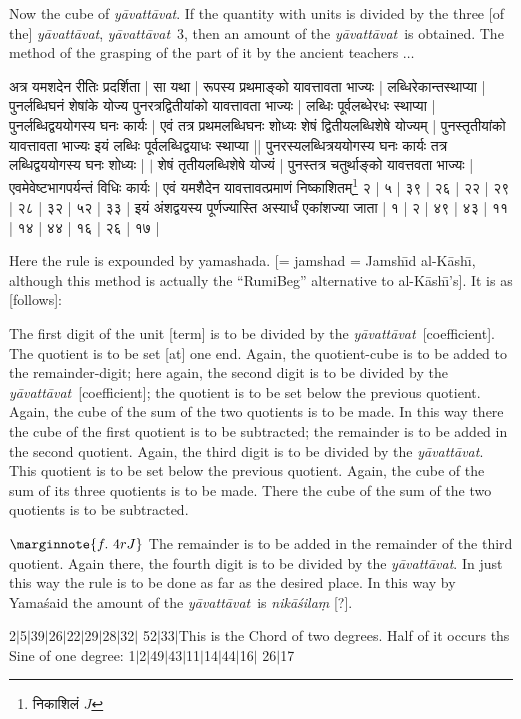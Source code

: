 \documentclass[12pt]{book}
\let\*=\d
\def\ya{\textit{y\=avat\-t\=avat}}
\def\elp{$\ldots$}
\def\danda{$|$}
\begin{document}
Now the cube of \ya.  If the quantity with units is divided by the three [of the] \ya,
\ya\ 3, 
then an amount of the \ya\ is obtained.    
The method of the grasping of the part of it 
by the ancient teachers \elp 

\newpage

{\s अत्र यमशदेन रीतिः प्रदर्शिता |
सा यथा | रूपस्य प्रथमाङ्को यावत्तावता भाज्यः | लब्धिरेकान्तस्थाप्या | पुनर्लब्धिघनं शेषांके योज्य
पुनरत्रद्वितीयांको यावत्तावता भाज्यः | लब्धिः पूर्वलब्धेरधः स्थाप्या | पुनर्लब्धिद्वययोगस्य घनः
कार्यः | एवं तत्र प्रथमलब्धिघनः शोध्यः शेषं द्वितीयलब्धि\-शेषे योज्यम् | पुनस्तृतीयांको
यावत्तावता भाज्यः इयं लब्धिः पूर्वलब्धिद्वयाधः स्थाप्या || पुनरस्यलब्धित्रययोगस्य घनः कार्यः
तत्र लब्धिद्वययोगस्य घनः शोध्यः | $|$ %
शेषं तृतीयलब्धिशेषे योज्यं | पुनस्तत्र चतुर्थाङ्को यावत्तवता भाज्यः | एवमेवेष्टभागपर्यन्तं विधिः कार्यः |
एवं यमशैदेन यावत्तावत्प्रमाणं निष्काशितम्\footnote{{\s निकाशिलं} $J$} २ | ५ | ३९ | २६ | २२ | २९ | २८ | ३२ | ५२ | ३३ | इयं
अंशद्वयस्य पूर्णज्यास्ति अस्यार्धं एकांशज्या जाता | १ | २ | ४९ | ४३ | ११ | १४ | ४४ | १६ | २६ | १७ |} 

\newpage

Here the rule is expounded by yamashada. 
[= jamshad = Jamsh\={\i}d al-K\=ash\={\i}, although this method is actually
the ``RumiBeg'' alternative to al-K\=ash\={\i}'s]. It is as [follows]:

The first digit of the unit [term] is to be divided by the \ya\ [coefficient]. The quotient is to be set
[at] one end. Again, the quotient-cube is to be added to the remainder-digit;
here again, the second digit is to be divided by the \ya\ [coefficient]; the quotient is to be  set
below the previous quotient. Again, the cube of the sum of the two quotients
is to be made.  In this way there the cube of the first quotient is to be subtracted;
the remainder is to be added in the second quotient. Again, the third digit is to be
divided by the \ya. This quotient is to be set below the previous quotient. Again,
the cube of the sum of its three quotients is to be made. There the cube of
the sum of the two quotients is to be subtracted. 

$\marginnote{f.~4r J}$
The remainder is to be added in the remainder of the third quotient. Again there, the 
fourth digit is to be divided by the \ya. In just this way the rule is to be done as far
as the desired place. In this way by  Yama\'said the amount of the \ya\ is 
\textit{nik\=a\'sila\*m} [?].

2\danda 5\danda 39\danda 26\danda 22\danda 29\danda 28\danda 32\danda
52\danda 33\danda This is the Chord of two degrees. Half of it occurs ths
Sine of one degree: 
1\danda 2\danda 49\danda 43\danda 11\danda 14\danda 44\danda 16\danda
26\danda 17 
\end{document}
